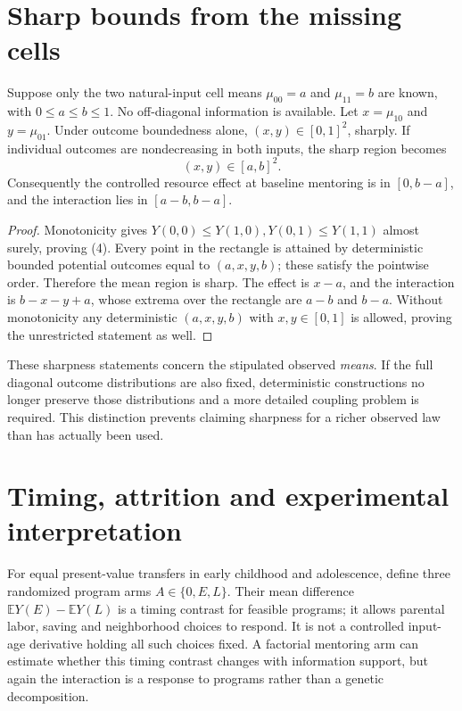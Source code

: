 \documentclass[11pt,a4paper]{article}
\newcommand{\E}{\mathbb E}
\begin{document}
\section{Sharp bounds from the missing cells}
Suppose only the two natural-input cell means $\mu_{00}=a$ and $\mu_{11}=b$ are known, with $0\le a\le b\le1$. No off-diagonal information is available. Let $x=\mu_{10}$ and $y=\mu_{01}$. Under outcome boundedness alone, $(x,y)\in[0,1]^2$, sharply. If individual outcomes are nondecreasing in both inputs, the sharp region becomes
\[
 (x,y)\in[a,b]^2.                                        \tag{4}
\]
Consequently the controlled resource effect at baseline mentoring is in $[0,b-a]$, and the interaction lies in $[a-b,b-a]$.

\begin{proof}
Monotonicity gives $Y(0,0)\le Y(1,0),Y(0,1)\le Y(1,1)$ almost surely, proving (4). Every point in the rectangle is attained by deterministic bounded potential outcomes equal to $(a,x,y,b)$; these satisfy the pointwise order. Therefore the mean region is sharp. The effect is $x-a$, and the interaction is $b-x-y+a$, whose extrema over the rectangle are $a-b$ and $b-a$. Without monotonicity any deterministic $(a,x,y,b)$ with $x,y\in[0,1]$ is allowed, proving the unrestricted statement as well.
\end{proof}

These sharpness statements concern the stipulated observed \emph{means}. If the full diagonal outcome distributions are also fixed, deterministic constructions no longer preserve those distributions and a more detailed coupling problem is required. This distinction prevents claiming sharpness for a richer observed law than has actually been used.

\section{Timing, attrition and experimental interpretation}
For equal present-value transfers in early childhood and adolescence, define three randomized program arms $A\in\{0,E,L\}$. Their mean difference $\E Y(E)-\E Y(L)$ is a timing contrast for feasible programs; it allows parental labor, saving and neighborhood choices to respond. It is not a controlled input-age derivative holding all such choices fixed. A factorial mentoring arm can estimate whether this timing contrast changes with information support, but again the interaction is a response to programs rather than a genetic decomposition.
\end{document}
